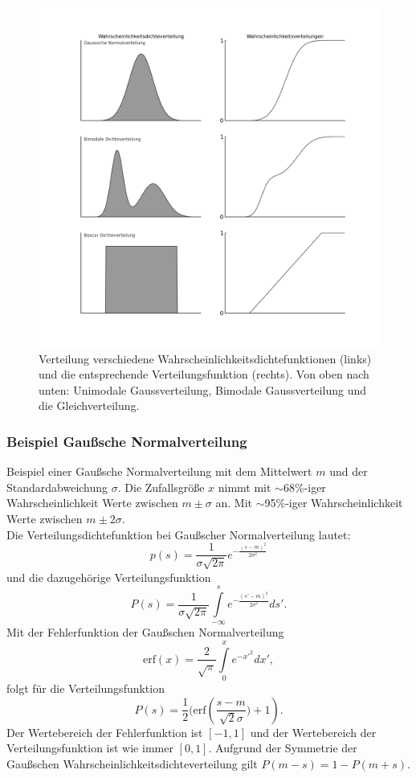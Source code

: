 \begin{figure}
\centering
\includegraphics[width=1\tw]{fig/02-Definitionen/dichtefunktionen.png}
\caption{Verteilung verschiedene Wahrscheinlichkeitsdichtefunktionen (links) und die entsprechende Verteilungsfunktion (rechts). Von oben nach unten: Unimodale Gaussverteilung, Bimodale Gaussverteilung und die Gleichverteilung.}
\label{fig:stoch_distribution}
\end{figure}

\subsubsection*{Beispiel Gaußsche Normalverteilung}
Beispiel einer Gaußsche Normalverteilung mit dem Mittelwert $m$ und der Standardabweichung $\sigma$. Die Zufallsgröße $x$ nimmt mit $\sim$68\%-iger Wahrscheinlichkeit Werte zwischen $m \pm \sigma$ an. Mit $\sim$95\%-iger Wahrscheinlichkeit Werte zwischen $m \pm 2\sigma$.\\
Die Verteilungsdichtefunktion bei Gaußscher Normalverteilung lautet:
\begin{equation}
p(s)=\frac{1}{\sigma \sqrt{2\pi}}e^{-\frac{(s-m)^2}{2\sigma^2}}
\end{equation}
und die dazugehörige Verteilungsfunktion
\[
P(s)=\frac{1}{\sigma \sqrt{2\pi}}\int\limits_{-\infty}^s e^{{-\frac{(s'-m)^2}{2\sigma^2}}}ds'.
\]
Mit der Fehlerfunktion der Gaußschen Normalverteilung
\[
\mbox{erf}(x)=\frac{2}{\sqrt{\pi}}\int\limits_0^x e^{-x'^2}dx',
\]
folgt für die Verteilungsfunktion
\[
P(s) = \frac{1}{2}(\mbox{erf}\left(\frac{s-m}{\sqrt{2} \sigma}) + 1\right).
\]
Der Wertebereich der Fehlerfunktion ist $[-1,1]$ und der Wertebereich der Verteilungsfunktion ist wie immer $[0,1]$. Aufgrund der Symmetrie der Gaußschen Wahrscheinlichkeitsdichteverteilung gilt $P(m-s) = 1 - P(m+s)$.

